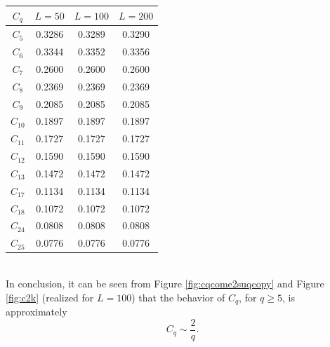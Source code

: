 \documentclass[aps,prd,showpacs,superscriptaddress,groupedaddress]{revtex4-1}  %
\begin{document}
\begin{tabular}{c|c|c|c}
	\textbf{ $C_q$} &\textbf{	$L=50$} & \textbf{$L=100$} & \textbf{$L=200$}\\
	\hline $C_5$ &	0.3286  & 0.3289 & 0.3290\\
	\hline $C_6$ &	0.3344  & 0.3352 & 0.3356\\
	\hline $C_7$ &	0.2600  & 0.2600 & 0.2600\\
	\hline $C_8$ &	0.2369 & 0.2369& 0.2369\\
	\hline $C_9$ &	0.2085  & 0.2085 & 0.2085\\
	\hline $C_{10}$ & 0.1897 & 0.1897&	0.1897\\
	\hline $C_{11}$ &	0.1727  & 0.1727 & 0.1727\\
	\hline $C_{12}$	& 0.1590 & 0.1590 & 0.1590 \\
	\hline $C_{13}$	& 0.1472 & 0.1472 & 0.1472 \\
	\hline $C_{17}$	& 0.1134 & 0.1134 & 0.1134 \\
	\hline $C_{18}$	& 0.1072 & 0.1072 & 0.1072 \\
	\hline $C_{24}$	& 0.0808 & 0.0808 & 0.0808 \\
	\hline $C_{25}$	& 0.0776 & 0.0776 & 0.0776 \\
\end{tabular}\\

In conclusion, it can be seen from Figure \ref{fig:cqcome2suqcopy} and Figure \ref{fig:c2k} (realized for $L=100$) that the behavior of $C_q$, for $q\geq 5$, is  approximately 
\begin{equation}\label{Cq-approx}
C_q \sim \dfrac{2}{q}.
\end{equation}
\end{document}
